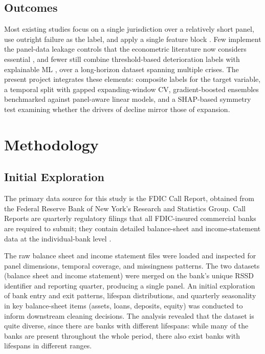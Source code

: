 \documentclass[conference]{IEEEtran}
\begin{document}
\subsection{Outcomes}

Most existing studies focus on a single jurisdiction over a relatively short panel, use outright failure as the label, and apply a single feature block \cite{b1}. Few implement the panel-data leakage controls that the econometric literature now considers essential \cite{b5}, and fewer still combine threshold-based deterioration labels \cite{b3} with explainable ML \cite{b9}, \cite{b10} over a long-horizon dataset spanning multiple crises. The present project integrates these elements: composite labels for the target variable, a temporal split with gapped expanding-window CV, gradient-boosted ensembles benchmarked against panel-aware linear models, and a SHAP-based symmetry test examining whether the drivers of decline mirror those of expansion.

\section{Methodology}
\subsection{Initial Exploration}

The primary data source for this study is the FDIC Call Report, obtained from the Federal Reserve Bank of New York's Research and Statistics Group. Call Reports are quarterly regulatory filings that all FDIC-insured commercial banks are required to submit; they contain detailed balance-sheet and income-statement data at the individual-bank level \cite{b14}. 

The raw balance sheet and income statement files were loaded and inspected for panel dimensions, temporal coverage, and missingness patterns. The two datasets (balance sheet and income statement) were merged on the bank's unique RSSD identifier and reporting quarter, producing a single panel. An initial exploration of bank entry and exit patterns, lifespan distributions, and quarterly seasonality in key balance-sheet items (assets, loans, deposits, equity) was conducted to inform downstream cleaning decisions. The analysis revealed that the dataset is quite diverse, since there are banks with different lifespans: while many of the banks are present throughout the whole period, there also exist banks with lifespans in different ranges.
\end{document}
